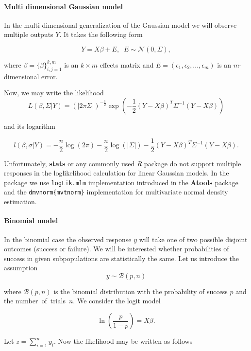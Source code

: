 \documentclass[12pt]{article}
\newcommand{\code}{\texttt}
\begin{document}
\paragraph{Multi dimensional Gaussian model} In the multi dimensional generalization of the Gaussian model we will observe multiple outputs $Y$. It takes the following form

$$Y = X \beta + E, \;\; E \sim \mathcal{N}(0, \Sigma),$$

where $\beta = \{\beta\}_{i,j=1}^{k,m}$ is an $k \times m$ effects matrix and $E = \left(\epsilon_1, \epsilon_2, ..., \epsilon_m\right)$ is an $m$-dimensional error.

Now, we may write the likelihood 
$$L\left(\beta, \Sigma | Y\right) = \left(|2\pi \Sigma|\right)^{-\frac{1}{2}} 
\exp{\left(-\frac{1}{2}\left(Y - X\beta\right)^T\Sigma^{-1}\left(Y - X\beta\right)\right)}$$

and its logarithm

$$l\left(\beta, \sigma | Y\right) = 
-\frac{n}{2} \log{\left(2\pi\right)} -\frac{n}{2} \log{\left(|\Sigma|\right)} -\frac{1}{2}\left(Y - X\beta\right)^T\Sigma^{-1}\left(Y - X\beta\right).$$

Unfortunately, \textbf{stats} or any commonly used \emph{R} package do not support multiple responses in the loglikelihood calculation for linear Gaussian models. In the package we use \code{logLik.mlm} implementation introduced in the \textbf{Atools} package \citep{atools} and the \code{dmvnorm\{mvtnorm\}} \citep{mvtnorm} implementation for multivariate normal density estimation.

\paragraph{Binomial model}

In the binomial case the observed response $y$ will take one of two possible disjoint outcomes (success or failure). We will be interested whether probabilities of success in given subpopulations are statistically the same. Let us introduce the assumption
$$y \sim \mathcal{B}\left(p, n\right)$$

where $\mathcal{B}\left(p,n\right)$ is the binomial distribution with the probability of success $p$ and the number~of~trials~$n$. We consider the logit model 

$$\ln\left(\frac{p}{1 - p}\right) = X \beta.$$

Let $z = \sum_{i = 1}^n y_i$. Now the likelihood may be written as follows  \citep{binom}
\end{document}
